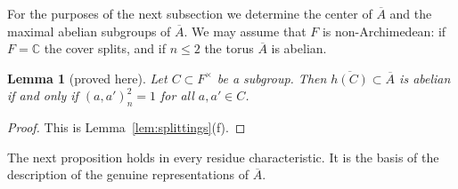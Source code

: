 \documentclass[12pt,letterpaper]{article}
\numberwithin{equation}{section}
\newtheorem{lemma}[theorem]{Lemma}
\theoremstyle{definition}
\newcommand{\proved}{proved here}
\newcommand{\C}{\mathbb C}
\newcommand{\bA}{\overline{A}}
\begin{document}
For the purposes of the next subsection we determine the center of $\bA$ and the maximal
abelian subgroups of $\bA$.  We may assume that $F$ is non-Archimedean: if $F=\C$ the
cover splits, and if $n\le2$ the torus $\bA$ is abelian.

\begin{lemma}[\proved]\label{lem:abelian}
Let $C\subset F^\times$ be a subgroup.  Then $\overline{h(C)}\subset\bA$ is abelian if and
only if $(a,a')_n^2=1$ for all $a,a'\in C$.
\end{lemma}
\begin{proof}
This is Lemma~\ref{lem:splittings}(f).
\end{proof}

The next proposition holds in every residue characteristic.  It is the basis of the
description of the genuine representations of $\bA$.
\end{document}
